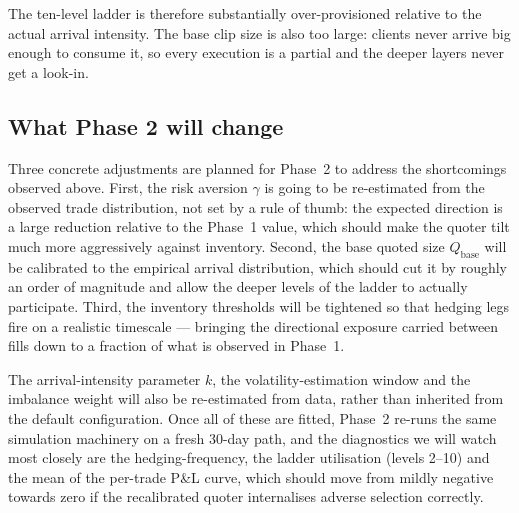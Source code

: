 The ten-level ladder is therefore substantially over-provisioned relative to the actual arrival intensity. The base clip size is also too large: clients never arrive big enough to consume it, so every execution is a partial and the deeper layers never get a look-in.

\subsection{What Phase 2 will change}

Three concrete adjustments are planned for Phase~2 to address the shortcomings observed above. First, the risk aversion $\gamma$ is going to be re-estimated from the observed trade distribution, not set by a rule of thumb: the expected direction is a large reduction relative to the Phase~1 value, which should make the quoter tilt much more aggressively against inventory. Second, the base quoted size $Q_{\text{base}}$ will be calibrated to the empirical arrival distribution, which should cut it by roughly an order of magnitude and allow the deeper levels of the ladder to actually participate. Third, the inventory thresholds will be tightened so that hedging legs fire on a realistic timescale --- bringing the directional exposure carried between fills down to a fraction of what is observed in Phase~1.

The arrival-intensity parameter $k$, the volatility-estimation window and the imbalance weight will also be re-estimated from data, rather than inherited from the default configuration. Once all of these are fitted, Phase~2 re-runs the same simulation machinery on a fresh 30-day path, and the diagnostics we will watch most closely are the hedging-frequency, the ladder utilisation (levels 2--10) and the mean of the per-trade P\&L curve, which should move from mildly negative towards zero if the recalibrated quoter internalises adverse selection correctly.
